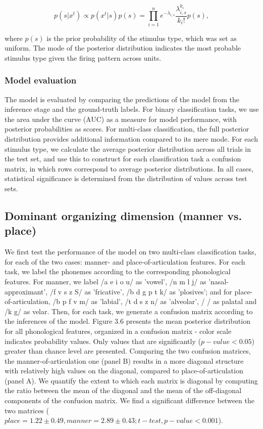\begin{equation}
    p(s|x^t) \propto p(x^t|s)p(s) = \prod_{i=1}^n{e^{-\lambda_{i,s}}\frac{\lambda_{i,s}^{k_i}}{k_i!}p(s)}, 
\end{equation}

where $p(s)$ is the prior probability of the stimulus type, which was set as uniform. The mode of the posterior distribution indicates the most probable stimulus type given the firing pattern across units. 

\subsubsection{Model evaluation}
The model is evaluated by comparing the predictions of the model from the inference stage and the ground-truth labels. For binary classification tasks, we use the area under the curve (AUC) as a measure for model performance, with posterior probabilities as scores. For multi-class classification, the full posterior distribution provides additional information compared to its mere mode. For each stimulus type, we calculate the average posterior distribution across all trials in the test set, and use this to construct for each classification task a confusion matrix, in which rows correspond to average posterior distributions. In all cases, statistical significance is determined from the distribution of values across test sets.

\subsection{Dominant organizing dimension (manner vs. place)}
We first test the performance of the model on two multi-class classification tasks, for each of the two cases: manner- and place-of-articulation features. For each task, we label the phonemes according to the corresponding phonological features. For manner, we label /a e i o u/ as 'vowel', /n m l j/ as 'nasal-approximant', /f v s z S/ as 'fricative', /b d g p t k/ as 'plosives'; and for place-of-articulation, /b p f v m/ as 'labial', /t d s z n/ as 'alveolar', / / as palatal and /k g/ as velar. Then, for each task, we generate a confusion matrix according to the inferences of the model. Figure 3.6 presents the mean posterior distribution for all phonological features, organized in a confusion matrix - color scale indicates probability values. Only values that are significantly ($p-value<0.05$) greater than chance level are presented. Comparing the two confusion matrices, the manner-of-articulation one (panel B) results in a more diagonal structure with relatively high values on the diagonal, compared to place-of-articulation (panel A). We quantify the extent to which each matrix is diagonal by computing the ratio between the mean of the diagonal and the mean of the off-diagonal components of the confusion matrix. We find a significant difference between the two matrices ($place = 1.22 \pm 0.49, manner = 2.89 \pm 0.43; t-test, p-value < 0.001$). 

